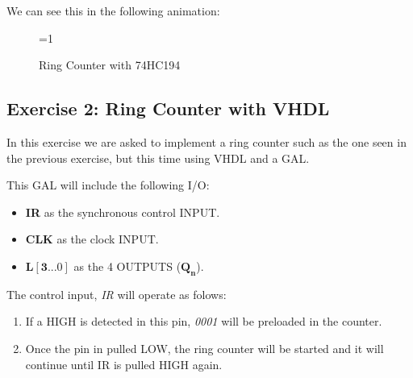 We can see this in the following animation:

\begin{figure}[H]
    \centering
 
    \ifnum\value{ANIMATION}=1 {
    } 
    \fi
    
    \caption{Ring Counter with 74HC194}
    \label{fig:74HC194_RING}
\end{figure}

\clearpage 

\subsection{Exercise 2: Ring Counter with VHDL}
\label{sec:RING_VHDL}

In this exercise we are asked to implement a ring counter such as the one seen in the previous exercise, but this time using VHDL and a GAL.\medskip

This GAL will include the following I/O:

\begin{itemize}
    \item \textbf{IR} as the synchronous control INPUT.
    \item \textbf{CLK} as the clock INPUT.
    \item $\mathbf{L\left[ 3...0 \right]}$ as the 4 OUTPUTS ($\mathbf{Q_n}$). 
\end{itemize}

The control input, \textit{IR} will operate as folows:

\begin{enumerate}
    \item If a HIGH is detected in this pin, \textit{0001} will be preloaded in the counter.
    \item Once the pin in pulled LOW, the ring counter will be started and it will continue until IR is pulled HIGH again. 
\end{enumerate}

